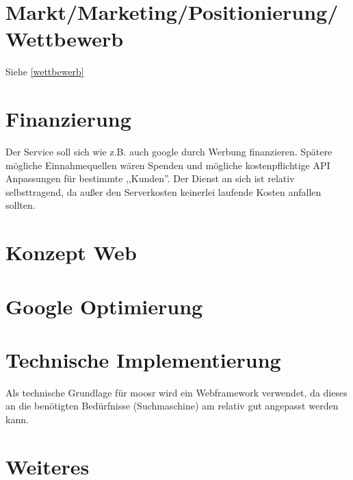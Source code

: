 \documentclass[11pt]{scrreprt}
\begin{document}
\chapter{Markt/Marketing/Positionierung/Wettbewerb}
Siehe \ref{wettbewerb}
\chapter{Finanzierung}
Der Service soll sich wie z.B. auch google durch Werbung finanzieren. Spätere
mögliche Einnahmequellen wären Spenden und mögliche kostenpflichtige API
Anpassungen für bestimmte ,,Kunden''.
Der Dienst an sich ist relativ selbsttragend, da außer den Serverkosten
keinerlei laufende Kosten anfallen sollten.

\chapter{Konzept Web}
\chapter{Google Optimierung}


\chapter{Technische Implementierung}
Als technische Grundlage für moosr wird ein Webframework verwendet, da dieses an
die benötigten Bedürfnisse (Suchmaschine) am relativ gut angepasst werden kann.


\chapter{Weiteres}
\end{document}
